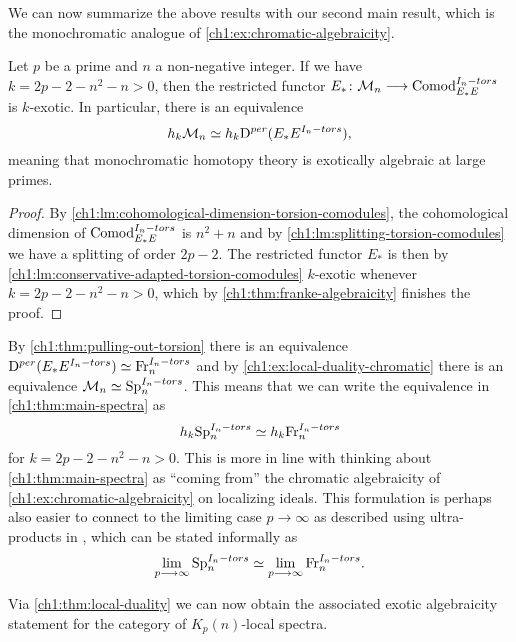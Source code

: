 We can now summarize the above results with our second main result, which is the monochromatic analogue of \cref{ch1:ex:chromatic-algebraicity}. 

\begin{theorem}
    \label{ch1:thm:main-spectra}
    Let $p$ be a prime and $n$ a non-negative integer. If we have $k=2p-2-n^2-n>0$, then the restricted functor $E_*\colon \mathcal{M}_{n}\longrightarrow \mathrm{Comod}_{E_*E}^{I_n-tors}$ is $k$-exotic. In particular, there is an equivalence 
    \begin{equation*}
        h_k \mathcal{M}_{n} \simeq h_k\mathrm{D}^{per}(E_*E^{I_n-tors}),
    \end{equation*}
    meaning that monochromatic homotopy theory is exotically algebraic at large primes. 
\end{theorem}
\begin{proof}
    By \cref{ch1:lm:cohomological-dimension-torsion-comodules}, the cohomological dimension of $\mathrm{Comod}_{E_*E}^{I_n-tors}$ is $n^2+n$ and by \cref{ch1:lm:splitting-torsion-comodules} we have a splitting of order $2p-2$. The restricted functor $E_*$ is then by \cref{ch1:lm:conservative-adapted-torsion-comodules} $k$-exotic whenever $k=2p-2-n^2-n>0$, which by \cref{ch1:thm:franke-algebraicity} finishes the proof. 
\end{proof}

\begin{remark}
    \label{ch1:rm:monochromatic-corresponds-to-torsion}
    By \cref{ch1:thm:pulling-out-torsion} there is an equivalence $\mathrm{D}^{per}(E_*E^{I_n-tors})\simeq \mathrm{Fr}_{n}^{I_n-tors}$ and by \cref{ch1:ex:local-duality-chromatic} there is an equivalence $\mathcal{M}_{n}\simeq \mathrm{Sp}_{n}^{I_n-tors}$. This means that we can write the equivalence in \cref{ch1:thm:main-spectra} as 
    $$h_k\mathrm{Sp}_{n}^{I_n-tors}\simeq h_k\mathrm{Fr}_{n}^{I_n-tors}$$
    for $k=2p-2-n^2-n>0$. This is more in line with thinking about \cref{ch1:thm:main-spectra} as ``coming from'' the chromatic algebraicity of \cref{ch1:ex:chromatic-algebraicity} on localizing ideals. This formulation is perhaps also easier to connect to the limiting case $p\to \infty$ as described using ultra-products in \cite{barthel-schlank-stapleton_2021}, which can be stated informally as 
    $$\lim_{p\longrightarrow \infty} \mathrm{Sp}_{n}^{I_n-tors}\simeq \lim_{p\longrightarrow \infty} \mathrm{Fr}_{n}^{I_n-tors}.$$
\end{remark}


Via \cref{ch1:thm:local-duality} we can now obtain the associated exotic algebraicity statement for the category of $K_p(n)$-local spectra.

